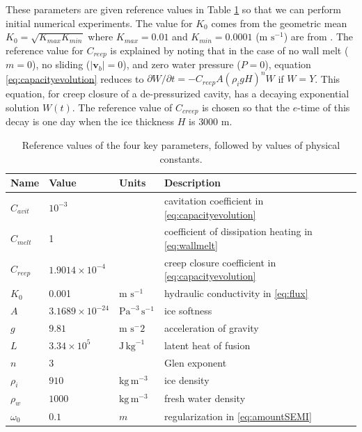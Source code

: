 \documentclass[11pt]{amsart}
\newcommand{\bv}{\mathbf{v}}
\newcommand{\Cavit}{C_{avit}}
\newcommand{\Cmelt}{C_{melt}}
\newcommand{\Creep}{C_{reep}}
\begin{document}
These parameters are given reference values in Table \ref{tab:referenceconstants} so that we can perform initial numerical experiments.  The value for $K_0$ comes from the geometric mean $K_0=\sqrt{K_{max} K_{min}}$ where $K_{max}=0.01$ and $K_{min}=0.0001$ (m $\text{s}^{-1}$) are from \citet{FlowersClarke2002_theory}.  The reference value for $C_{reep}$ is explained by noting that in the case of no wall melt ($m=0$), no sliding ($|\bv_b|=0$), and zero water pressure ($P=0$), equation \eqref{eq:capacityevolution} reduces to $\partial W/\partial t = - C_{reep} A (\rho_i g H)^n W$ if $W=Y$.  This equation, for creep closure of a de-pressurized cavity, has a decaying exponential solution $W(t)$.  The reference value of $C_{creep}$ is chosen so that the $e$-time of this decay is one day when the ice thickness $H$ is $3000$ m.

\begin{table}[ht]
  \centering
  \caption{Reference values of the four key parameters, followed by values of physical constants.}
  \begin{tabular}{lllp{3.0in}} 
    \textbf{Name} & \textbf{Value} & \textbf{Units} & \textbf{Description}\\
\hline
    $\Cavit$ & $10^{-3}$ & & cavitation coefficient in \eqref{eq:capacityevolution} \\
    $\Cmelt$ & 1 & & coefficient of dissipation heating in \eqref{eq:wallmelt} \\
    $\Creep$ & $1.9014\times 10^{-4}$ & & creep closure coefficient in \eqref{eq:capacityevolution} \\
    $K_0$ & 0.001 & m $\text{s}^{-1}$ & hydraulic conductivity in \eqref{eq:flux}  \\ 
\hline
    $A$ & $3.1689\times 10^{-24}$ & $\text{Pa}^{-3}\,\text{s}^{-1}$ & ice softness \citep{EISMINT96} \\
    $g$ & $9.81$ & m $\text{s}^-2$ & acceleration of gravity \\
    $L$ & $3.34\times 10^5$ & $\text{J}\,\text{kg}^{-1}$ & latent heat of fusion \citep{GreveBlatter2009} \\
    $n$ & 3 & & Glen exponent \citep{EISMINT96} \\
    $\rho_i$ & $910$ & $\text{kg}\,\text{m}^{-3}$ & ice density \citep{GreveBlatter2009} \\
    $\rho_w$ & $1000$ & $\text{kg}\,\text{m}^{-3}$ & fresh water density \citep{GreveBlatter2009}  \\
    $\omega_0$ & $0.1$ & $m$ & regularization in \eqref{eq:amountSEMI}  \\
    \hline
  \end{tabular}
 \label{tab:referenceconstants}
\end{table}
\end{document}
